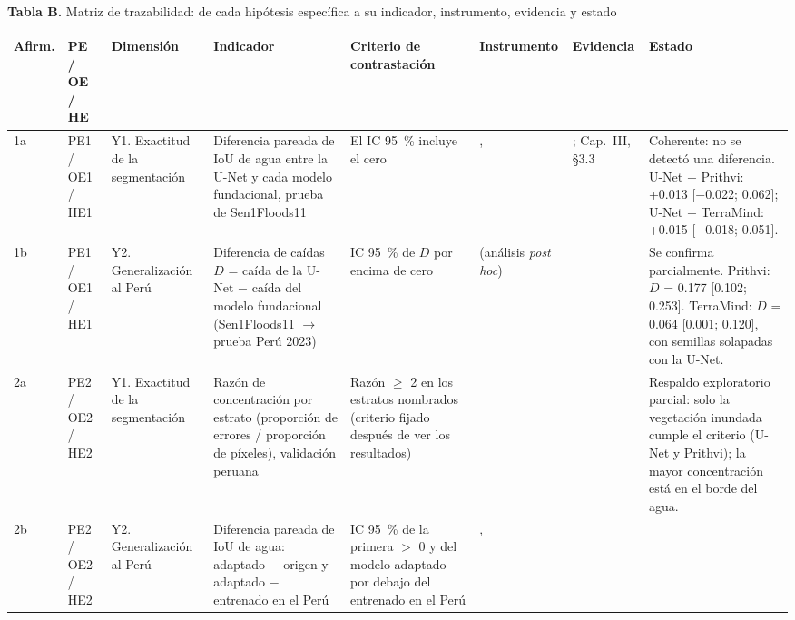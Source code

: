 \documentclass[10pt]{article}
\newcommand{\ingles}[1]{\textit{#1}}
\begin{document}
\newpage
\textbf{Tabla B.} Matriz de trazabilidad: de cada hipótesis específica a su indicador, instrumento,
evidencia y estado
\smallskip

{\scriptsize\setlength{\tabcolsep}{3.5pt}
\begin{longtable}{|L{0.8cm}|L{1.3cm}|L{2.2cm}|L{4.1cm}|L{3.2cm}|L{3.8cm}|L{4.0cm}|L{5.0cm}|}
\hline
\textbf{Afirm.} & \textbf{PE / OE / HE} & \textbf{Dimensión} & \textbf{Indicador} &
\textbf{Criterio de contrastación} & \textbf{Instrumento} & \textbf{Evidencia} & \textbf{Estado} \\
\hline
\endhead
1a & PE1 / OE1 / HE1 & Y1. Exactitud de la segmentación &
Diferencia pareada de IoU de agua entre la U-Net y cada modelo fundacional, prueba de Sen1Floods11 &
El IC 95~\% incluye el cero &
,  &
; Cap.~III, §3.3 &
Coherente: no se detectó una diferencia. U-Net $-$ Prithvi: +0.013 [$-$0.022; 0.062]; U-Net $-$
TerraMind: +0.015 [$-$0.018; 0.051]. \\ \hline
1b & PE1 / OE1 / HE1 & Y2. Generalización al Perú &
Diferencia de caídas $D$ = caída de la U-Net $-$ caída del modelo fundacional (Sen1Floods11 $\to$
prueba Perú 2023) &
IC 95~\% de $D$ por encima de cero &
 (análisis \ingles{post hoc}) &
 &
Se confirma parcialmente. Prithvi: $D$ = 0.177 [0.102; 0.253]. TerraMind: $D$ = 0.064 [0.001;
0.120], con semillas solapadas con la U-Net. \\ \hline
2a & PE2 / OE2 / HE2 & Y1. Exactitud de la segmentación &
Razón de concentración por estrato (proporción de errores / proporción de píxeles), validación
peruana &
Razón $\geq$ 2 en los estratos nombrados (criterio fijado después de ver los resultados) &
 &
 &
Respaldo exploratorio parcial: solo la vegetación inundada cumple el criterio (U-Net y Prithvi);
la mayor concentración está en el borde del agua. \\ \hline
2b & PE2 / OE2 / HE2 & Y2. Generalización al Perú &
Diferencia pareada de IoU de agua: adaptado $-$ origen y adaptado $-$ entrenado en el Perú &
IC 95~\% de la primera $>$ 0 y del modelo adaptado por debajo del entrenado en el Perú &
,  &
 &

\end{longtable}}
\end{document}
